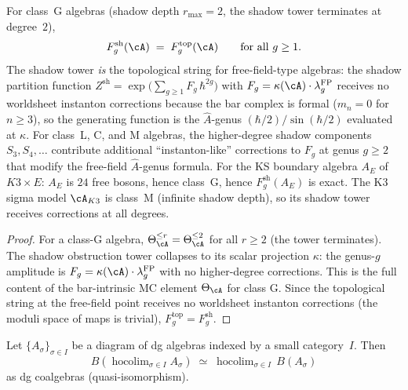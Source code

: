 \begin{proposition}[Class G algebras: shadow $=$ topological string]
\label{prop:class-g-no-instantons}
\ClaimStatusProvedHere\quad
For class~G algebras \textup{(}shadow depth $r_{\max} = 2$,
the shadow tower terminates at degree~$2$\textup{)},
\begin{equation}\label{eq:class-g-exact}
F_g^{\mathrm{sh}}(\cA) \;=\; F_g^{\mathrm{top}}(\cA)
\qquad \text{for all } g \geq 1.
\end{equation}
The shadow tower \emph{is} the topological string for
free-field-type algebras: the shadow partition function
$Z^{\mathrm{sh}} = \exp\!\bigl(\sum_{g \geq 1}
F_g\,\hbar^{2g}\bigr)$ with
$F_g = \kappa(\cA) \cdot \lambda_g^{\mathrm{FP}}$ receives no
worldsheet instanton corrections because the bar complex is
formal \textup{(}$m_n = 0$ for $n \geq 3$\textup{)},
so the generating function is the $\hat{A}$-genus
$(\hbar/2)/\sin(\hbar/2)$ evaluated at $\kappa$. For
class~L, C, and M algebras, the higher-degree shadow
components $S_3, S_4, \ldots$ contribute additional
``instanton-like'' corrections to $F_g$ at genus $g \geq 2$
that modify the free-field $\hat{A}$-genus formula.
For the KS boundary algebra $A_E$ of $K3 \times E$:
$A_E$ is $24$ free bosons, hence class~G, hence
$F_g^{\mathrm{sh}}(A_E)$ is exact. The K3 sigma model
$\cA_{K3}$ is class~M \textup{(}infinite shadow depth\textup{)},
so its shadow tower receives corrections at all degrees.
\end{proposition}

\begin{proof}
For a class-G algebra, $\Theta_\cA^{\leq r} = \Theta_\cA^{\leq 2}$
for all $r \geq 2$ (the tower terminates). The shadow obstruction
tower collapses to its scalar projection $\kappa$: the genus-$g$
amplitude is $F_g = \kappa(\cA) \cdot \lambda_g^{\mathrm{FP}}$ with no higher-degree corrections. This is the full content of the
bar-intrinsic MC element $\Theta_\cA$ for class G. Since the
topological string at the free-field point receives no worldsheet
instanton corrections (the moduli space of maps is trivial),
$F_g^{\mathrm{top}} = F_g^{\mathrm{sh}}$.
\end{proof}


\begin{proposition}
\label{prop:bar-hocolim}
\ClaimStatusProvedHere\quad
Let $\{A_\sigma\}_{\sigma \in I}$ be a diagram of dg algebras
indexed by a small category~$I$. Then
\begin{equation}\label{eq:bar-hocolim}
B\!\left(\operatorname{hocolim}_{\sigma \in I} A_\sigma\right)
\;\simeq\;
\operatorname{hocolim}_{\sigma \in I}\, B(A_\sigma)
\end{equation}
as dg coalgebras \textup{(}quasi-isomorphism\textup{)}.
\end{proposition}


